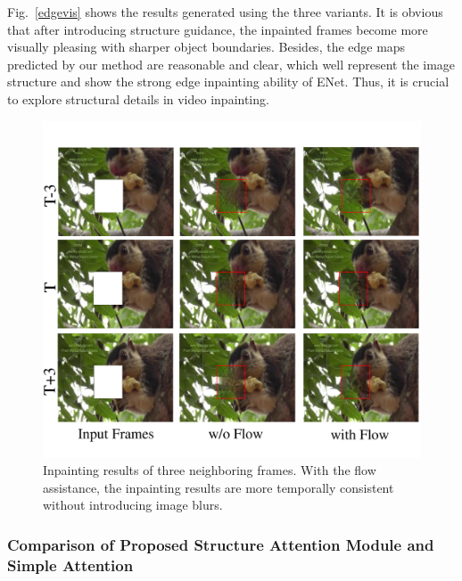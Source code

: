 Fig.~\ref{edgevis} shows the results generated using the three variants. 
It is obvious that after introducing structure guidance, the inpainted frames become more visually pleasing with sharper object boundaries. 
Besides, the edge maps predicted by our method are reasonable and clear, which well represent the image structure and show the strong edge inpainting ability of ENet. 
Thus, it is crucial to explore structural details in video inpainting.
 



\begin{figure}[t]
	\centering
	\includegraphics[width=0.9\columnwidth]{flow_vis} %
	\caption{Inpainting results of three neighboring frames. With the flow assistance, the inpainting results are more temporally consistent without introducing image blurs. }
	\label{flow_vis}
\end{figure}




\subsubsection{Comparison of Proposed Structure Attention Module and Simple Attention}

